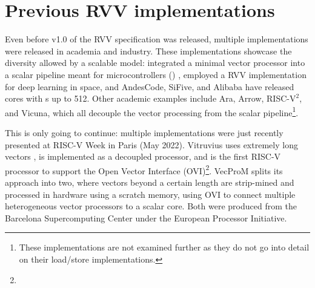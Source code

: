 \section{Previous RVV implementations\label{chap:bg:rvvend}}
Even before v1.0 of the RVV specification was released, multiple implementations were released in academia and industry.
These implementations showcase the diversity allowed by a scalable model: \citeauthor{johnsMinimalRISCVVector2020} integrated a minimal vector processor into a scalar pipeline meant for microcontrollers () \cite{johnsMinimalRISCVVector2020}, \citeauthor{dimascioOnBoardDecisionMaking2021} employed a RVV implementation for deep learning in space\cite{dimascioOnBoardDecisionMaking2021}, and AndesCode, SiFive, and Alibaba have released cores with s up to 512\cite{AndesCoreNX27VProcessor}\cite{SiFiveIntelligenceX280}\cite{chenXuantie910CommercialMultiCore2020}.
Other academic examples include Ara\cite{cavalcanteAra1GHzScalable2020}, Arrow\cite{assirArrowRISCVVector2021}, RISC-$\text{V}^2$\cite{patsidisRISCV2ScalableRISCV2020}, and Vicuna\cite{platzerVicunaTimingPredictableRISCV2021}, which all decouple the vector processing from the scalar pipeline\footnote{These implementations are not examined further as they do not go into detail on their load/store implementations.}.

This is only going to continue: multiple implementations were just recently presented at RISC-V Week in Paris (May 2022).
Vitruvius\cite{minerviniVitruviusAreaEfficientRISCV2022} uses extremely long vectors , is implemented as a decoupled processor, and is the first RISC-V processor to support the Open Vector Interface (OVI)\footnote{}.
VecProM\cite{mahaleRISCVVPUVery2021} splits its approach into two, where vectors beyond a certain length are strip-mined and processed in hardware using a scratch memory, using OVI to connect multiple heterogeneous vector processors to a scalar core.
Both were produced from the Barcelona Supercomputing Center under the European Processor Initiative.

